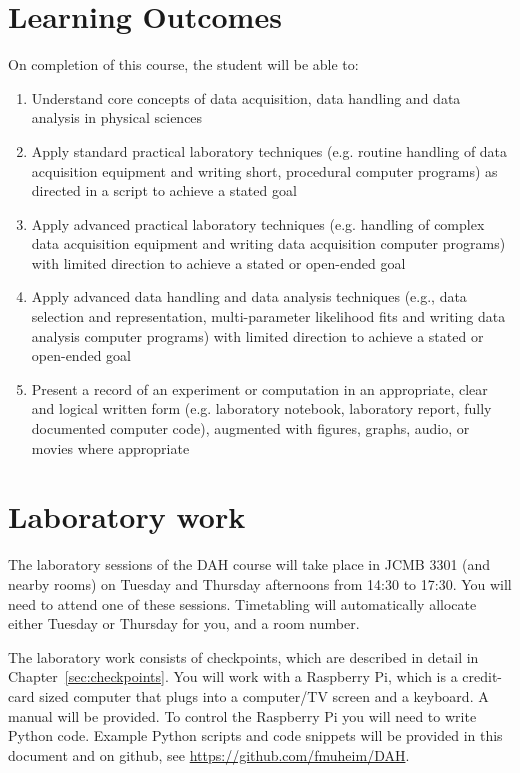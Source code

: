\section{Learning Outcomes}

On completion of this course, the student will be able to:
\begin{enumerate}
\item Understand core concepts of data acquisition, data handling and data analysis in physical sciences
\item Apply standard practical laboratory techniques (e.g. routine handling of data acquisition equipment and writing short, procedural computer programs) as directed in a script to achieve a stated goal
\item Apply advanced practical laboratory techniques (e.g. handling of complex data acquisition equipment and writing data acquisition computer programs) with limited direction to achieve a stated or open-ended goal
\item Apply advanced data handling and data analysis techniques (e.g., data selection and representation, multi-parameter likelihood fits and writing data analysis computer programs) with limited direction to achieve a stated or open-ended goal
\item Present a record of an experiment or computation in an appropriate, clear and logical written form (e.g. laboratory notebook, laboratory report, fully documented computer code), augmented with figures, graphs, audio, or movies where appropriate
\end{enumerate}

\newpage
\section{Laboratory work}

The laboratory sessions of the DAH course will take place in JCMB 3301 (and nearby rooms) on Tuesday and Thursday afternoons from 14:30 to 17:30.%
You will need to attend one of these sessions.
Timetabling will automatically allocate either Tuesday or Thursday for you, and a room number.

The laboratory work consists of checkpoints, which are described in detail in Chapter~\ref{sec:checkpoints}.
You will work with a Raspberry Pi, which is a credit-card sized computer that plugs into a computer/TV screen and a keyboard.
A manual will be provided.
To control the Raspberry Pi you will need to write Python code.
Example Python scripts and code snippets will be provided in this document and on github, see \url{https://github.com/fmuheim/DAH}. 

